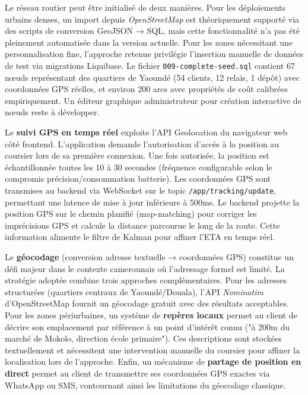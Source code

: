 Le réseau routier peut être initialisé de deux manières. Pour les déploiements urbains denses, un import depuis \textit{OpenStreetMap} est théoriquement supporté via des scripts de conversion GeoJSON → SQL, mais cette fonctionnalité n'a pas été pleinement automatisée dans la version actuelle. Pour les zones nécessitant une personnalisation fine, l'approche retenue privilégie l'insertion manuelle de données de test via migrations Liquibase. Le fichier \texttt{009-complete-seed.sql} contient 67 nœuds représentant des quartiers de Yaoundé (54 clients, 12 relais, 1 dépôt) avec coordonnées GPS réelles, et environ 200 arcs avec propriétés de coût calibrées empiriquement. Un éditeur graphique administrateur pour création interactive de nœuds reste à développer.

Le \textbf{suivi GPS en temps réel} exploite l'API Geolocation du navigateur web côté frontend. L'application demande l'autorisation d'accès à la position au coursier lors de sa première connexion. Une fois autorisée, la position est échantillonnée toutes les 10 à 30 secondes (fréquence configurable selon le compromis précision/consommation batterie). Les coordonnées GPS sont transmises au backend via WebSocket sur le topic \texttt{/app/tracking/update}, permettant une latence de mise à jour inférieure à 500ms. Le backend projette la position GPS sur le chemin planifié (map-matching) pour corriger les imprécisions GPS et calcule la distance parcourue le long de la route. Cette information alimente le filtre de Kalman pour affiner l'ETA en temps réel.

Le \textbf{géocodage} (conversion adresse textuelle → coordonnées GPS) constitue un défi majeur dans le contexte camerounais où l'adressage formel est limité\cite{cameroon_roads}. La stratégie adoptée combine trois approches complémentaires. Pour les adresses structurées (quartiers centraux de Yaoundé/Douala), l'API \textit{Nominatim} d'OpenStreetMap fournit un géocodage gratuit avec des résultats acceptables. Pour les zones périurbaines, un système de \textbf{repères locaux} permet au client de décrire son emplacement par référence à un point d'intérêt connu ("à 200m du marché de Mokolo, direction école primaire"). Ces descriptions sont stockées textuellement et nécessitent une intervention manuelle du coursier pour affiner la localisation lors de l'approche. Enfin, un mécanisme de \textbf{partage de position en direct} permet au client de transmettre ses coordonnées GPS exactes via WhatsApp ou SMS, contournant ainsi les limitations du géocodage classique.

